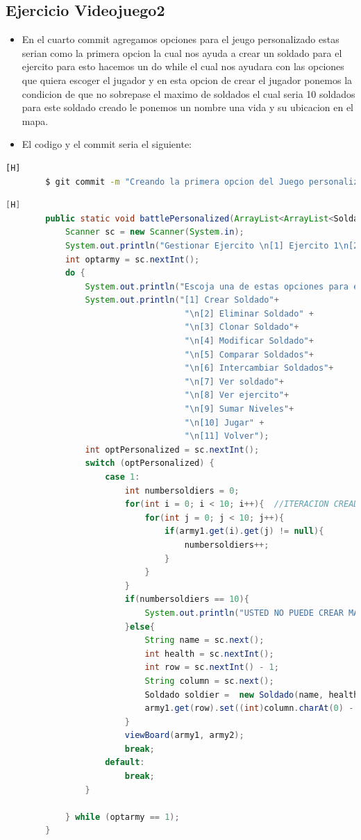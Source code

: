 \documentclass{article}
\begin{document}
	\subsection{Ejercicio Videojuego2}
	\begin{itemize}	
		\item En el cuarto commit agregamos opciones para el jeugo personalizado estas serian como la primera opcion la cual nos ayuda a crear un soldado para el ejercito para esto hacemos un do while el cual nos ayudara con las opciones que quiera escoger el jugador y en esta opcion de crear el jugador ponemos la condicion de que no sobrepase el maximo de soldados el cual seria 10 soldados para este soldado creado le ponemos un nombre una vida y su ubicacion en el mapa.  
		\item El codigo y el commit seria el siguiente:
	\end{itemize}	
	\begin{lstlisting}[language=bash,caption={Commit}][H]
		$ git commit -m "Creando la primera opcion del Juego personalizado"
	\end{lstlisting}	
	\begin{lstlisting}[language=java,caption={Las lineas de codigos del metodo creado:}][H]
		public static void battlePersonalized(ArrayList<ArrayList<Soldado>> army1 , ArrayList<ArrayList<Soldado>> army2){
			Scanner sc = new Scanner(System.in);
			System.out.println("Gestionar Ejercito \n[1] Ejercito 1\n[2] Ejercito 2");
			int optarmy = sc.nextInt();
			do {
				System.out.println("Escoja una de estas opciones para el ejercito 1");
				System.out.println("[1] Crear Soldado"+
									"\n[2] Eliminar Soldado" + 
									"\n[3] Clonar Soldado"+
									"\n[4] Modificar Soldado"+
									"\n[5] Comparar Soldados"+
									"\n[6] Intercambiar Soldados"+
									"\n[7] Ver soldado"+
									"\n[8] Ver ejercito"+
									"\n[9] Sumar Niveles"+
									"\n[10] Jugar" +
									"\n[11] Volver");
				int optPersonalized = sc.nextInt();
				switch (optPersonalized) {
					case 1:
						int numbersoldiers = 0;
						for(int i = 0; i < 10; i++){  //ITERACION CREADA PARA PODER SABER QUE SI ESTE BANDO DEL EJERCITO TIENE SOLDADOS PARA PODER JUGAR SI TIENE 10 ESTA OPCION ESTA CANCELADA
							for(int j = 0; j < 10; j++){
								if(army1.get(i).get(j) != null){
									numbersoldiers++;
								}
							}
						}
						if(numbersoldiers == 10){
							System.out.println("USTED NO PUEDE CREAR MAS SOLDADOS EL MAXIMO ES 10 SOLDADOS POR EJERCITO");
						}else{
							String name = sc.next();
							int health = sc.nextInt();
							int row = sc.nextInt() - 1;
							String column = sc.next();
							Soldado soldier =  new Soldado(name, health, numbersoldiers, column);
							army1.get(row).set((int)column.charAt(0) - 65, soldier);
						}
						viewBoard(army1, army2);
						break;
					default:
						break;
				}
				
			} while (optarmy == 1);
		}
	\end{lstlisting}
\end{document}
